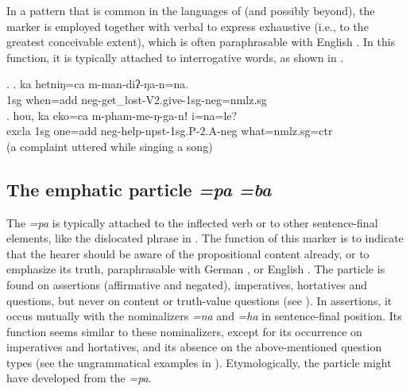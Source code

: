  
In a pattern that is common in the languages of  (and possibly beyond), the  marker is employed together with verbal  to express exhaustive  (i.e., to the greatest conceivable extent),  which is often paraphrasable with  English . In this function, it is typically attached to interrogative words, as shown in \Next.
 
 \ex. \ag. ka hetniŋ=ca m-man-diʔ-ŋa-n=na.\\
 {\sc 1sg} when{\sc =add} {\sc neg-}get\_lost{\sc -V2.give-1sg-neg=nmlz.sg}\\
 \bg. hou,   ka       eko=ca        m-pham-me-ŋ-ga-nǃ                    i=na=le?\\
 {\sc excla} {\sc 1sg} one{\sc =add} {\sc neg-}help{\sc -npst-1sg.P-2.A-neg} what{\sc =nmlz.sg=ctr}\\
  (a complaint uttered while singing a song) 
 


\subsection{The emphatic particle \emph{=pa \ti =ba}}

The  \emph{=pa} is typically attached to the inflected verb or to other sentence-final elements, like the dislocated phrase in \Next[a]. The function of this marker is to indicate that the hearer should be aware of the propositional content already, or to emphasize its truth, paraphrasable with German , or English . The particle is found on assertions (affirmative and negated), imperatives, hortatives and  questions, but never on content or truth-value questions (see \Next).  In assertions, it occus mutually  with the nominalizers \emph{=na} and \emph{=ha} in sentence-final position. Its function seems similar to these nominalizers, except for its occurrence on imperatives and hortatives, and its absence on the above-mentioned question types (see the ungrammatical examples in \NNext). Etymologically, the particle might have developed from the  \emph{=pa}. 

